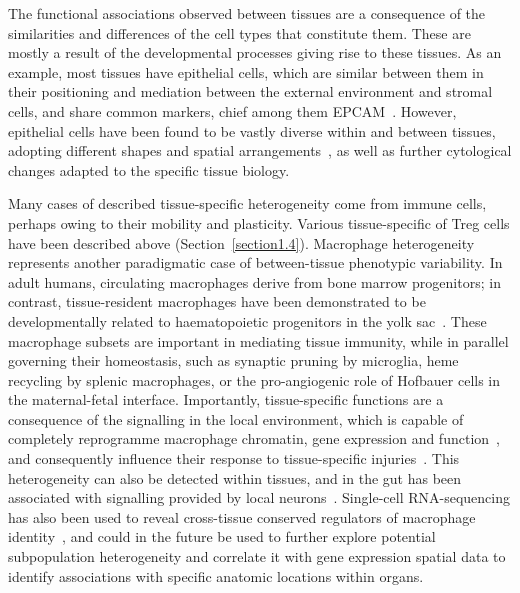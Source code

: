 The functional associations observed between tissues are a consequence of the similarities and differences of the cell types that constitute them. These are mostly a result of the developmental processes giving rise to these tissues. As an example, most tissues have epithelial cells, which are similar between them in their positioning and mediation between the external environment and stromal cells, and share common markers, chief among them EPCAM~\citep{trzpis_epithelial_2007}. However, epithelial cells have been found to be vastly diverse within and between tissues, adopting different shapes and spatial arrangements~\citep{wang_normal_2012}, as well as further cytological changes adapted to the specific tissue biology.

Many cases of described tissue-specific heterogeneity come from immune cells, perhaps owing to their mobility and plasticity. Various tissue-specific of Treg cells have been described above (Section~\ref{section1.4}). Macrophage heterogeneity represents another paradigmatic case of between-tissue phenotypic variability. In adult humans, circulating macrophages derive from bone marrow progenitors; in contrast, tissue-resident macrophages have been demonstrated to be developmentally related to haematopoietic progenitors in the yolk sac~\citep{gomez_perdiguero_tissue-resident_2015}. These macrophage subsets are important in mediating tissue immunity, while in parallel governing their homeostasis, such as synaptic pruning by microglia, heme recycling by splenic macrophages, or the pro-angiogenic role of Hofbauer cells in the maternal-fetal interface. Importantly, tissue-specific functions are a consequence of the signalling in the local environment, which is capable of completely reprogramme macrophage chromatin, gene expression and function~\citep{lavin_tissue-resident_2014,gosselin_environment_2014}, and consequently influence their response to tissue-specific injuries~\citep{hoyer_tissue-specific_2019}. This heterogeneity can also be detected within tissues, and in the gut has been associated with signalling provided by local neurons~\citep{gabanyi_neuro-immune_2016}. Single-cell RNA-sequencing has also been used to reveal cross-tissue conserved regulators of macrophage identity~\citep{scott_transcription_2018}, and could in the future be used to further explore potential subpopulation heterogeneity and correlate it with gene expression spatial data to identify associations with specific anatomic locations within organs.

